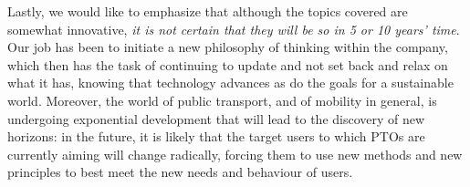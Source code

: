 Lastly, we would like to emphasize that although the topics covered are somewhat innovative, \textit{it is not certain that they will be so in 5 or 10 years' time}. Our job has been to initiate a new philosophy of thinking within the company, which then has the task of continuing to update and not set back and relax on what it has, knowing that technology advances as do the goals for a sustainable world. Moreover, the world of public transport, and of mobility in general, is undergoing exponential development that will lead to the discovery of new horizons: in the future, it is likely that the target users to which PTOs are currently aiming will change radically, forcing them to use new methods and new principles to best meet the new needs and behaviour of users.


